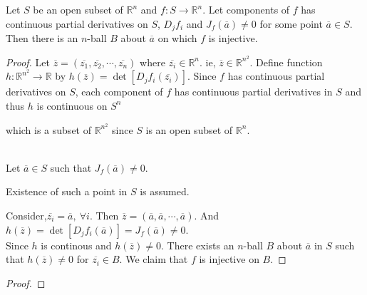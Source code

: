 \begin{theorem}
	Let $S$ be an open subset of $\mathbb{R}^n$ and $f : S \to \mathbb{R}^n$. Let components of $f$ has continuous partial derivatives on $S$, $D_jf_i$ and $J_f(\overline{a}) \ne 0$ for some point $\overline{a} \in S$. Then there is an $n$-ball $B$ about $\overline{a}$ on which $f$ is injective.
\end{theorem}
\begin{proof}
	Let $\overline{z} = (\overline{z_1},\overline{z_2},\cdots,\overline{z_n})$ where $\overline{z_i} \in \mathbb{R}^n$. ie, $\overline{z} \in \mathbb{R}^{n^2}$. Define function $h : \mathbb{R}^{n^2} \to \mathbb{R}$ by $h(\overline{z}) = \det{[D_jf_i(\overline{z_i})]}$. Since $f$ has continuous partial derivatives on $S$, each component of $f$ has continuous partial derivatives in $S$ and thus $h$ is continuous on $S^n$ \begin{commentary} which is a subset of $\mathbb{R}^{n^2}$ since $S$ is an open subset of $\mathbb{R}^n$.\end{commentary}\\

	Let $\overline{a} \in S$ such that $J_f(\overline{a}) \ne 0$. \begin{commentary} Existence of such a point in $S$ is assumed.\end{commentary} Consider,$\overline{z_i} = \overline{a},\ \forall i$. Then $\overline{z} = (\overline{a},\overline{a},\cdots,\overline{a})$. And $h(\overline{z}) = \det{[D_jf_i(\overline{a})]} = J_f(\overline{a}) \ne 0$.\\

	Since $h$ is continous and $h(\overline{z}) \ne 0$. There exists an $n$-ball $B$ about $\overline{a}$ in $S$ such that $h(\overline{z}) \ne 0$ for $\overline{z_i} \in B$. We claim that $f$ is injective on $B$.
\end{proof}

\begin{theorem}
\end{theorem}
\begin{proof}
\end{proof}

